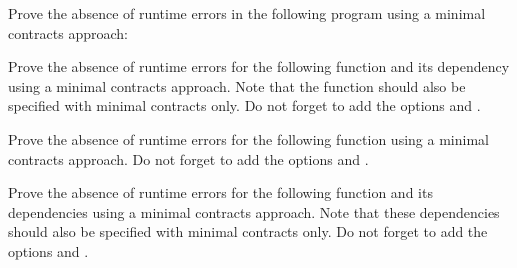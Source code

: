Prove the absence of runtime errors in the following program using a minimal
contracts approach:






Prove the absence of runtime errors for the following 
function and its dependency using a minimal contracts approach. Note that the
 function should also be specified with minimal contracts only.
Do not forget to add the options  and
.







Prove the absence of runtime errors for the following 
function using a minimal contracts approach. Do not forget to add the options
 and .






Prove the absence of runtime errors for the following 
function and its dependencies using a minimal contracts approach. Note that
these dependencies should also be specified with minimal contracts only.
Do not forget to add the options  and
.


